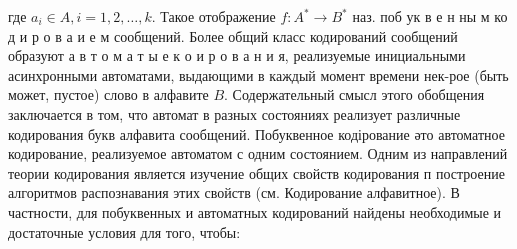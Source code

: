 \documentclass[10pt]{article}
\begin{document}
где $a_{i} \in A, i=1,2, \ldots, k$. Такое отображение $f: A^{*} \rightarrow B^{*}$ наз. поб ук в е н ны м ко д и р о в а и е м сообщений. Более общий класс кодирований сообщений образуют а в т о м а т ы е к о и р о в а н и я, реализуемые инициальными асинхронными автоматами, выдающими в каждый момент времени нек-рое (быть может, пустое) слово в алфавите $B$. Содержательный смысл этого обобщения заключается в том, что автомат в разных состояниях реализует различные кодирования букв алфавита сообщений. Побуквенное кодірование әто автоматное кодирование, реализуемое автоматом с одним состоянием. Одним из направлений теории кодирования является изучение общих свойств кодирования п построение алгоритмов распознавания этих свойств (см. Кодирование алфавитное). В частности, для побуквенных и автоматных кодирований найдены необходимые и достаточные условия для того, чтобы:
\end{document}
